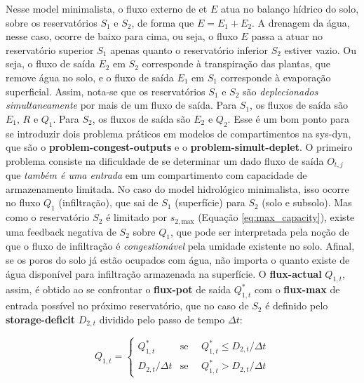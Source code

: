 \documentclass[./main.tex]{subfiles}
\begin{document}
\par Nesse \gls{model} minimalista, o fluxo externo de \acrlong{et} $E$ atua no balanço hídrico do solo, sobre os reservatórios $S_1$ e $S_2$, de forma que $E = E_1 + E_2$. A drenagem da água, nesse caso, ocorre de baixo para cima, ou seja, o fluxo $E$ passa a atuar no reservatório superior $S_1$ apenas quanto o reservatório inferior $S_2$ estiver vazio. Ou seja, o fluxo de saída $E_2$ em $S_2$ corresponde à transpiração das plantas, que remove água no solo, e o fluxo de saída $E_1$ em $S_1$ corresponde à evaporação superficial. Assim, nota-se que os reservatórios $S_1$ e $S_2$ são \textit{deplecionados simultaneamente} por mais de um fluxo de saída. Para $S_1$, os fluxos de saída são $E_1$, $R$ e $Q_1$. Para $S_2$, os fluxos de saída são $E_2$ e $Q_2$. Esse é um bom ponto para se introduzir dois problema práticos em modelos de compartimentos na \gls{sys-dyn}, que são o \textbf{\gls{problem-congest-outputs}} e o \textbf{\gls{problem-simult-deplet}}. O primeiro problema consiste na dificuldade de se determinar um dado fluxo de saída $O_{t,j}$ que \textit{também é uma entrada} em um compartimento com capacidade de armazenamento limitada. No caso do \gls{model} hidrológico minimalista, isso ocorre no fluxo $Q_1$ (infiltração), que sai de $S_1$ (superfície) para $S_2$ (solo e subsolo). Mas como o reservatório $S_2$ é limitado por $s_{2, \text{max}}$ (Equação \eqref{eq:max_capacity}), existe uma \gls{feedback} negativa de $S_2$ sobre $Q_1$, que pode ser interpretada pela noção de que o fluxo de infiltração é \textit{congestionável} pela umidade existente no solo. Afinal, se os poros do solo já estão ocupados com água, não importa o quanto existe de água disponível para infiltração armazenada na superfície. O \textbf{\gls{flux-actual}} $Q_{1,t}$, assim, é obtido ao se confrontar o \textbf{\gls{flux-pot}} de saída $Q^*_{1,t}$ com o \textbf{\gls{flux-max}} de entrada possível no próximo reservatório, que no caso de $S_2$ é definido pelo \textbf{\gls{storage-deficit}} $D_{2,t}$ dividido pelo passo de tempo $\Delta t$:
\begin{linenomath*}
\begin{equation} 
	\label{eq:congest_1}
 Q_{1,t} = 
\begin{cases} 
    Q^*_{1,t} & \text{se } \quad Q^*_{1,t} \leq D_{2,t} / \Delta t\\
    D_{2,t} / \Delta t & \text{se } \quad Q^*_{1,t} > D_{2,t} / \Delta t
\end{cases}
\end{equation}
\end{linenomath*}
\end{document}
